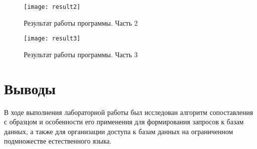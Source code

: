 \documentclass[a4paper,14pt]{extarticle}
\begin{document}
\begin{figure}[H]
  \centering
  \texttt{[image: result2]}
  \caption{Результат работы программы. Часть 2}
  \label{fig:result2}
\end{figure}

\begin{figure}[H]
  \centering
  \texttt{[image: result3]}
  \caption{Результат работы программы. Часть 3}
  \label{fig:result3}
\end{figure}

\section*{Выводы}
В ходе выполнения лабораторной работы был исследован алгоритм сопоставления с
образцом и особенности его применения для формирования запросов к базам данных,
а также для организации доступа к базам данных на ограниченном подмножестве
естественного языка.
\end{document}
